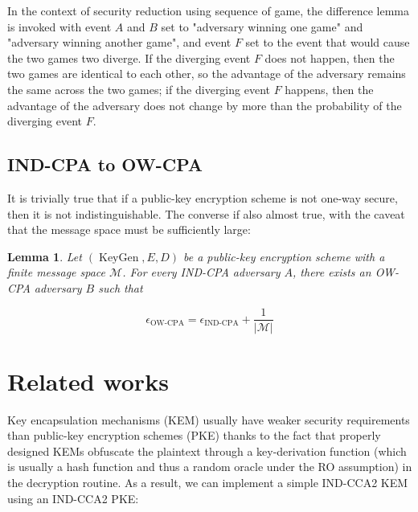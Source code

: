 \documentclass{article}
\newcommand{\norm}[1]{\vert {#1} \vert}
\newtheorem{lemma}{Lemma}
\begin{document}
In the context of security reduction using sequence of game, the difference lemma is invoked with event $A$ and $B$ set to "adversary winning one game" and "adversary winning another game", and event $F$ set to the event that would cause the two games two diverge. If the diverging event $F$ does not happen, then the two games are identical to each other, so the advantage of the adversary remains the same across the two games; if the diverging event $F$ happens, then the advantage of the adversary does not change by more than the probability of the diverging event $F$.

\subsection{IND-CPA to OW-CPA}
It is trivially true that if a public-key encryption scheme is not one-way secure, then it is not indistinguishable. The converse if also almost true, with the caveat that the message space must be sufficiently large: 

\begin{lemma}
    Let $(\operatorname{KeyGen}, E, D)$ be a public-key encryption scheme with a finite message space $\mathcal{M}$. For every IND-CPA adversary $A$, there exists an OW-CPA adversary $B$ such that

    \begin{equation*}
        \epsilon_\text{OW-CPA} = \epsilon_\text{IND-CPA} + \frac{1}{\norm{\mathcal{M}}}
    \end{equation*}
\end{lemma}

\section{Related works}
    Key encapsulation mechanisms (KEM) usually have weaker security requirements than public-key encryption schemes (PKE) thanks to the fact that properly designed KEMs obfuscate the plaintext through a key-derivation function (which is usually a hash function and thus a random oracle under the RO assumption) in the decryption routine. As a result, we can implement a simple IND-CCA2 KEM using an IND-CCA2 PKE:
\end{document}
